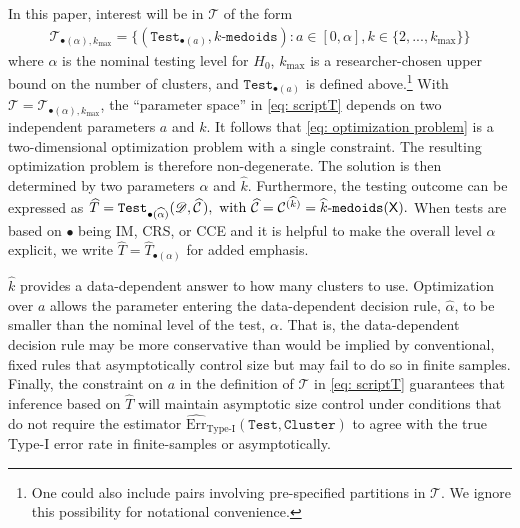 \documentclass[preprint]{imsart}
\numberwithin{equation}{section}
\theoremstyle{plain}
\theoremstyle{definition}
\renewcommand{\(}{\left(}
\renewcommand{\)}{\right)}
\renewcommand{\[}{\left[}
\renewcommand{\]}{\right]}
\renewcommand{\hat}{\widehat}
\newcommand{\G}{k}
\newcommand{\Test}{\mathtt{Test}}
\newcommand{\Cluster}{\mathtt{Cluster}}
\renewcommand{\hat}{\widehat}
\begin{document}
{{ In this paper, interest will be in $\mathscr T$ of the form \begin{align}\label{eq: scriptT}
	\mathscr T_{\bullet(\alpha), \G_{\max}} =\Big \{ (\Test_{\bullet(a)},  k\text{-}\texttt{medoids}) : a \in [0,\alpha], k \in \{ 2,...,{\G_{\mathrm{max}}} \}  \Big \}
\end{align}
where $\alpha$ is the nominal testing level for $H_0$, 
${\G_{\mathrm{max}}}$ is a researcher-chosen upper bound on the number of clusters, and $\Test_{\bullet(a)}$ is defined above.\footnote{One could also include pairs involving pre-specified partitions in $\mathscr{T}$. We ignore this possibility for notational convenience.} 
With $\mathscr T = \mathscr T_{\bullet(\alpha), \G_{\max}}$, the ``parameter space''  in \eqref{eq: scriptT} depends on two independent parameters $a$ and $\G$.  It follows that \eqref{eq: optimization problem} is a two-dimensional optimization problem with a single constraint. The resulting optimization problem is therefore non-degenerate. The solution is then determined by two parameters $\hat \alpha$ and $\hat \G$.  Furthermore, the testing outcome can be expressed as
$\hat T = \Test_{\bullet( \hat \alpha )}(\mathscr D, \hat {\mathcal C} \hspace{.4mm} ), \ \text{with } \hat {\mathcal C} = \mathcal C^{(\hat \G)} = \hat\G \text{-}\texttt{medoids}(\mathsf X).$  When tests are based on $\bullet$ being  IM, CRS, or CCE and it is helpful to make the overall level $\alpha$ explicit, we write $\hat T = \hat T_{\bullet(\alpha)}$ for added emphasis.

$\hat \G$ provides a data-dependent answer to how many clusters to use. Optimization over $a$ allows the parameter entering the data-dependent decision rule, $\hat \alpha$, to be smaller than the nominal level of the test, $\alpha$. That is, the data-dependent decision rule may be more conservative than would be implied by conventional, fixed rules that asymptotically control size but may fail to do so in finite samples. Finally, the constraint on $a$ in the definition of $\mathscr{T}$ in \eqref{eq: scriptT} guarantees that inference based on $\hat T$ will maintain asymptotic size control under conditions that do not require the estimator $\widehat{\text{Err}}_{\text{Type-I}}(\Test, \Cluster)$ to agree with the true Type-I error rate in finite-samples or asymptotically. 

}}
\end{document}

